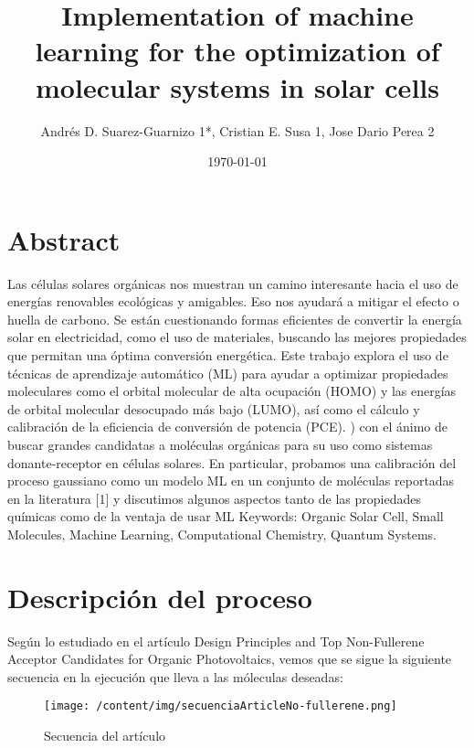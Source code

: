 \documentclass{article}%
\title{Implementation of machine learning for the optimization of molecular systems in solar cells}%
\author{Andrés D. Suarez{-}Guarnizo 1*, Cristian E. Susa 1, Jose Dario Perea 2}%
\date{\today}%
\begin{document}
%
\normalsize%
\maketitle%
\section{Abstract}%
\label{sec:Abstract}%
Las células solares orgánicas nos muestran un camino interesante hacia el uso de energías renovables ecológicas y amigables. Eso nos ayudará a mitigar el efecto o huella de carbono. Se están cuestionando formas eficientes de convertir la energía solar en electricidad, como el uso de materiales, buscando las mejores propiedades que permitan una óptima conversión energética. Este trabajo explora el uso de técnicas de aprendizaje automático (ML) para ayudar a optimizar propiedades moleculares como el orbital molecular de alta ocupación (HOMO) y las energías de orbital molecular desocupado más bajo (LUMO), así como el cálculo y calibración de la eficiencia de conversión de potencia (PCE). ) con el ánimo de buscar grandes candidatas a moléculas orgánicas para su uso como sistemas donante{-}receptor en células solares. En particular, probamos una calibración del proceso gaussiano como un modelo ML en un conjunto de moléculas reportadas en la literatura {[}1{]} y discutimos algunos aspectos tanto de las propiedades químicas como de la ventaja de usar ML%
Keywords: Organic Solar Cell, Small Molecules, Machine Learning, Computational Chemistry, Quantum Systems.

%
\section{Descripción del proceso}%
\label{sec:Descripcindelproceso}%
Según lo estudiado en el artículo Design Principles and Top Non{-}Fullerene Acceptor Candidates for Organic Photovoltaics, vemos que se sigue la siguiente secuencia en la ejecución que lleva a las móleculas deseadas:%


\begin{figure}[h!]%
\centering%
\texttt{[image: /content/img/secuenciaArticleNo-fullerene.png]}%
\caption{Secuencia del artículo}%
\end{figure}
\end{document}
